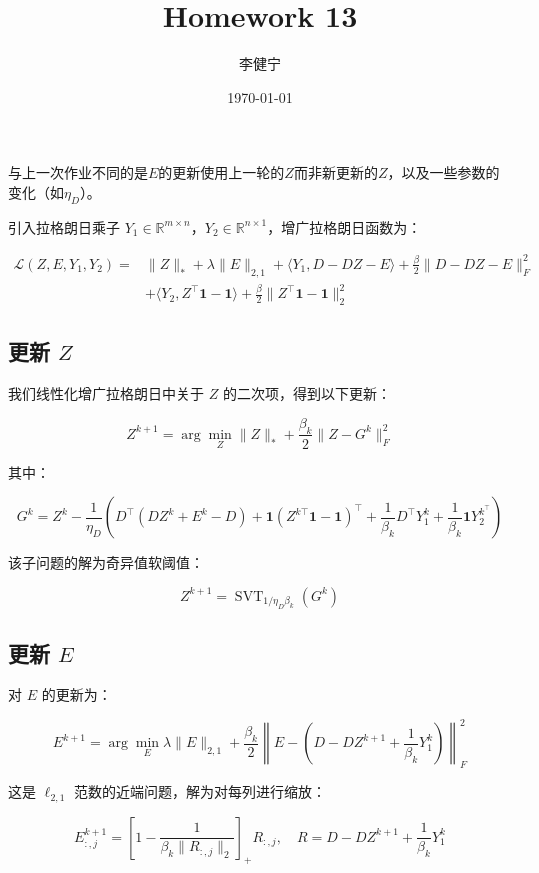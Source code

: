 \documentclass{homework}
\author{李健宁}
\date{\today}
\title{Homework 13}
\begin{document}
 \maketitle

\question

\begin{sol}
与上一次作业不同的是$E$的更新使用上一轮的$Z$而非新更新的$Z$，以及一些参数的变化（如$\eta_D$）。

    引入拉格朗日乘子 \( Y_1 \in \mathbb{R}^{m \times n} \)，\( Y_2 \in \mathbb{R}^{n \times 1} \)，增广拉格朗日函数为：

\[
\begin{aligned}
\mathcal{L}(Z, E, Y_1, Y_2) = &\|Z\|_* + \lambda \|E\|_{2,1} + \langle Y_1, D - DZ - E \rangle + \frac{\beta}{2} \|D - DZ - E\|_F^2 \\
&+ \langle Y_2, Z^\top \mathbf{1} - \mathbf{1} \rangle + \frac{\beta}{2} \|Z^\top \mathbf{1} - \mathbf{1}\|_2^2
\end{aligned}
\]


\subsection*{更新 \( Z \)}

我们线性化增广拉格朗日中关于 \( Z \) 的二次项，得到以下更新：

\[
Z^{k+1} = \arg\min_Z \|Z\|_* + \frac{\beta_k}{2} \|Z - G^k\|_F^2
\]

其中：

\[
G^k = Z^k - \frac{1}{\eta_D} \left( D^\top (D Z^k + E^k - D) + \mathbf{1}(Z^{k\top} \mathbf{1} - \mathbf{1})^\top + \frac 1{\beta_k}D^\top Y_1^k + \frac 1{\beta_k}\mathbf{1} Y_2^{k^\top} \right)
\]

该子问题的解为奇异值软阈值：

\[
Z^{k+1} = \operatorname{SVT}_{1/\eta_D\beta_k}(G^k)
\]

\subsection*{更新 \( E \)}

对 \( E \) 的更新为：

\[
E^{k+1} = \arg\min_E \lambda \|E\|_{2,1} + \frac{\beta_k}{2} \left\| E - \left(D - D Z^{k+1} + \frac{1}{\beta_k} Y_1^k \right) \right\|_F^2
\]

这是 \( \ell_{2,1} \) 范数的近端问题，解为对每列进行缩放：

\[
E^{k+1}_{:,j} = \left[1 - \frac{1}{\beta_k\|R_{:,j}\|_2} \right]_+ R_{:,j}, \quad R = D - D Z^{k+1} + \frac{1}{\beta_k} Y_1^k
\]


\end{sol}
\end{document}
